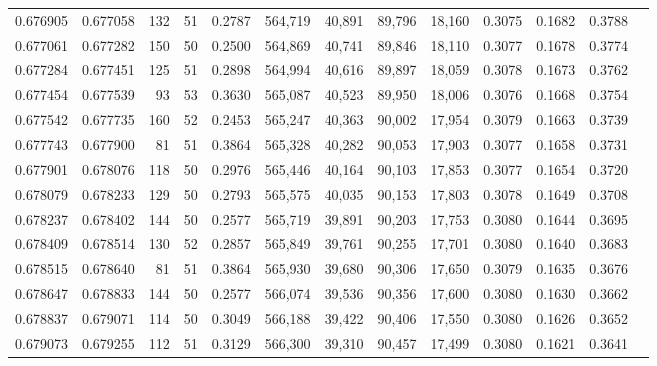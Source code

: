 \begin{tabular}{rrrrrrrrrrrrr}
0.676905 & 0.677058 &   132 &  51 &                                     0.2787 & 564,719 &  40,891 &  89,796 &  18,160 & 0.3075 & 0.1682 & 0.3788 \\
0.677061 & 0.677282 &   150 &  50 &                                     0.2500 & 564,869 &  40,741 &  89,846 &  18,110 & 0.3077 & 0.1678 & 0.3774 \\
0.677284 & 0.677451 &   125 &  51 &                                     0.2898 & 564,994 &  40,616 &  89,897 &  18,059 & 0.3078 & 0.1673 & 0.3762 \\
0.677454 & 0.677539 &    93 &  53 &                                     0.3630 & 565,087 &  40,523 &  89,950 &  18,006 & 0.3076 & 0.1668 & 0.3754 \\
0.677542 & 0.677735 &   160 &  52 &                                     0.2453 & 565,247 &  40,363 &  90,002 &  17,954 & 0.3079 & 0.1663 & 0.3739 \\
0.677743 & 0.677900 &    81 &  51 &                                     0.3864 & 565,328 &  40,282 &  90,053 &  17,903 & 0.3077 & 0.1658 & 0.3731 \\
0.677901 & 0.678076 &   118 &  50 &                                     0.2976 & 565,446 &  40,164 &  90,103 &  17,853 & 0.3077 & 0.1654 & 0.3720 \\
0.678079 & 0.678233 &   129 &  50 &                                     0.2793 & 565,575 &  40,035 &  90,153 &  17,803 & 0.3078 & 0.1649 & 0.3708 \\
0.678237 & 0.678402 &   144 &  50 &                                     0.2577 & 565,719 &  39,891 &  90,203 &  17,753 & 0.3080 & 0.1644 & 0.3695 \\
0.678409 & 0.678514 &   130 &  52 &                                     0.2857 & 565,849 &  39,761 &  90,255 &  17,701 & 0.3080 & 0.1640 & 0.3683 \\
0.678515 & 0.678640 &    81 &  51 &                                     0.3864 & 565,930 &  39,680 &  90,306 &  17,650 & 0.3079 & 0.1635 & 0.3676 \\
0.678647 & 0.678833 &   144 &  50 &                                     0.2577 & 566,074 &  39,536 &  90,356 &  17,600 & 0.3080 & 0.1630 & 0.3662 \\
0.678837 & 0.679071 &   114 &  50 &                                     0.3049 & 566,188 &  39,422 &  90,406 &  17,550 & 0.3080 & 0.1626 & 0.3652 \\
0.679073 & 0.679255 &   112 &  51 &                                     0.3129 & 566,300 &  39,310 &  90,457 &  17,499 & 0.3080 & 0.1621 & 0.3641 \\

\end{tabular}
